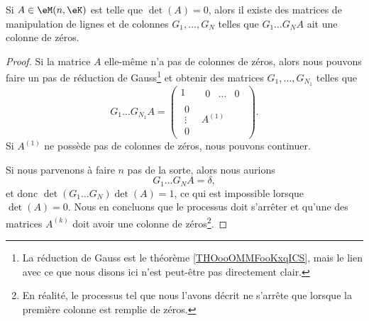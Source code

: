 \begin{proposition} \label{PROPooPMYCooAAtHsB}
    Si \( A\in \eM(n,\eK)\) est telle que \( \det(A)=0\), alors il existe des matrices de manipulation de lignes et de colonnes \( G_1,\ldots, G_N\) telles que \( G_1\ldots G_NA\) ait une colonne de zéros.
\end{proposition}

\begin{proof}
    Si la matrice \( A\) elle-même n'a pas de colonnes de zéros, alors nous pouvons faire un pas de réduction de Gauss\footnote{La réduction de Gauss est le théorème \ref{THOooOMMFooKxqICS}, mais le lien avec ce que nous disons ici n'est peut-être pas directement clair.} 
    et obtenir des matrices \( G_1,\ldots,  G_{N_1}\) telles que
    \begin{equation}
        G_1\ldots G_{N_1}A=
      \begin{pmatrix}
            1    &   \begin{matrix} 
                0    &   \ldots    &   0    
            \end{matrix}\\ 
            \begin{matrix}
                0    \\ 
                \vdots    \\ 
                0    
            \end{matrix}& A^{(1)}
        \end{pmatrix}.
    \end{equation}
    Si \( A^{(1)}\) ne possède pas de colonnes de zéros, nous pouvons continuer. 

    Si nous parvenons à faire \( n\) pas de la sorte, alors nous aurions
    \begin{equation}
        G_1\ldots G_NA=\delta,
    \end{equation}
    et donc \( \det(G_1\ldots G_N)\det(A)=1\), ce qui est impossible lorsque \( \det(A)=0\). Nous en concluons que le processus doit s'arrêter et qu'une des matrices \( A^{(k)}\) doit avoir une colonne de zéros\footnote{En réalité, le processus tel que nous l'avons décrit ne s'arrête que lorsque la première colonne est remplie de zéros.}.
\end{proof}

